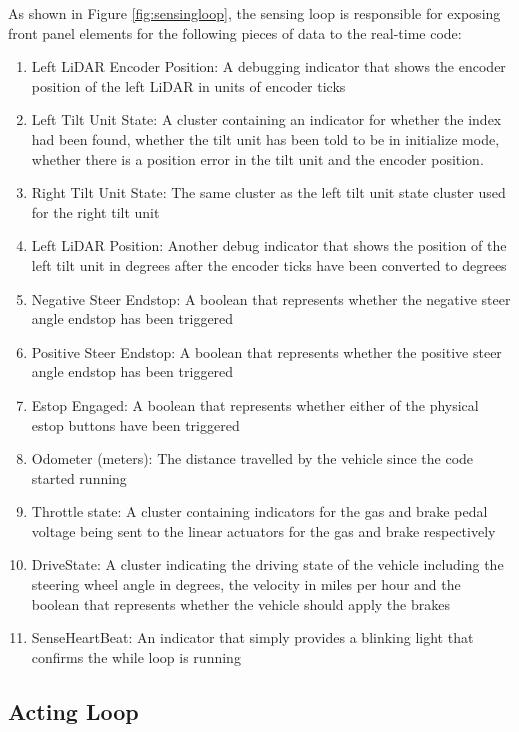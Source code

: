 \noindent As shown in Figure \ref{fig:sensingloop}, the sensing loop is responsible for exposing front panel elements for the following pieces of data to the real-time code:

\begin{enumerate}
\item Left LiDAR Encoder Position: A debugging indicator that shows the encoder position of the left LiDAR in units of encoder ticks
\item Left Tilt Unit State: A cluster containing an indicator for whether the index had been found, whether the tilt unit has been told to be in initialize mode, whether there is a position error in the tilt unit and the encoder position.
\item Right Tilt Unit State: The same cluster as the left tilt unit state cluster used for the right tilt unit
\item Left LiDAR Position: Another debug indicator that shows the position of the left tilt unit in degrees after the encoder ticks have been converted to degrees
\item Negative Steer Endstop: A boolean that represents whether the negative steer angle endstop has been triggered
\item Positive Steer Endstop: A boolean that represents whether the positive steer angle endstop has been triggered
\item Estop Engaged: A boolean that represents whether either of the physical estop buttons have been triggered
\item Odometer (meters): The distance travelled by the vehicle since the code started running
\item Throttle state: A cluster containing indicators for the gas and brake pedal voltage being sent to the linear actuators for the gas and brake respectively
\item DriveState: A cluster indicating the driving state of the vehicle including the steering wheel angle in degrees, the velocity in miles per  hour and the boolean that represents whether the vehicle should apply the brakes
\item SenseHeartBeat: An indicator that simply provides a blinking light that confirms the while loop is running 
\end{enumerate}

\subsection{Acting Loop}

